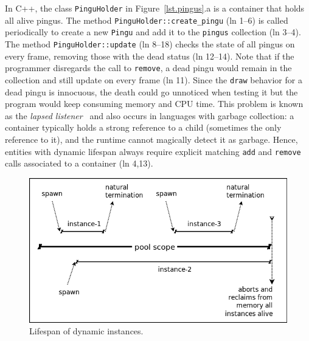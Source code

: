 \documentclass[10pt, conference, compsocconf]{IEEEtran}
\newcommand{\code}[1] {{\small{\texttt{#1}}}}
\begin{document}
In C++, the class \code{PinguHolder} in Figure~\ref{lst.pingus}.a is a
container that holds all alive pingus.
%
The method \code{PinguHolder::create\_pingu} (ln 1--6) is called periodically
to create a new \code{Pingu} and add it to the \code{pingus} collection
(ln 3--4).
The method \code{PinguHolder::update} (ln 8--18) checks the state of all
pingus on every frame, removing those with the dead status (ln 12--14).
%
Note that if the programmer disregards the call to \code{remove}, a dead pingu
would remain in the collection and still update on every frame (ln 11).
Since the \code{draw} behavior for a dead pingu is innocuous, the death could
go unnoticed when testing it but the program would keep consuming memory and
CPU time.
%
This problem is known as the \emph{lapsed listener}~\cite{games.patterns} and
also occurs in languages with garbage collection:
a container typically holds a strong reference to a child (sometimes the only 
reference to it), and the runtime cannot magically detect it as garbage.
%
Hence, entities with dynamic lifespan always require explicit matching
\code{add} and \code{remove} calls associated to a container (ln 4,13).

\begin{figure}
\centering
\includegraphics[width=\columnwidth]{pool}
\caption{Lifespan of dynamic instances.
\label{fig.pool}
}
\end{figure}
\end{document}
